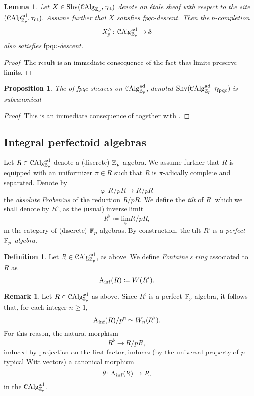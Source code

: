 \documentclass[10pt,a4paper]{amsart}
\numberwithin{equation}{subsection}
\newtheorem{lemma}[theorem]{Lemma}
\newtheorem{proposition}[theorem]{Proposition}
\theoremstyle{definition}
\newtheorem{remark}[theorem]{Remark}
\newtheorem{definition}[theorem]{Definition}
\def\lim{\mathrm{lim}}
\begin{document}
\begin{lemma}
    Let $X \in \mathrm{Shv}(\mathcal{C}\mathrm{Alg}_{\mathbb Z_p}, \tau_{\text{\'et}})$ denote an \'etale sheaf with respect to the site $(\mathcal C \mathrm{Alg}^{\mathrm{ad}}_{\mathbb Z_p}, \tau_{\text{\'et}})$. Assume further that $X$ satisfies \emph{fpqc}-descent. Then the $p$-completion
        \[
                X^\wedge_p \colon \mathcal C \mathrm{Alg}^{\mathrm{ad}}_{\mathbb Z_p} \to \mathcal S  
        \]
    also satisfies $\mathrm{fpqc}$-descent.
\end{lemma}

\begin{proof}
    The result is an immediate consequence of the fact that limits preserve limits. 
\end{proof}

\begin{proposition}
    The \infcat of fpqc-sheaves on $\mathcal C \mathrm{Alg}^{\mathrm{ad}}_{\mathbb Z_p}$, denoted $\mathrm{Shv}(\mathcal C \mathrm{Alg}^{\mathrm{ad}}_{\mathbb Z_p}, \tau_{\mathrm{fpqc}})$ is subcanonical.
\end{proposition}

\begin{proof}
    This is an immediate consequence of \cite[Theorem 5.15]{Lurie_Spectral_Schemes} together with \cite[Proposition 8.1.2.1]{lurie2016spectral}.
\end{proof}
\subsection{Integral perfectoid algebras}

Let $R \in \mathcal C \mathrm{Alg}^{\mathrm{ad}}_{\mathbb Z_p}$ denote a (discrete) $\mathbb Z_p$-algebra. We assume further that $R$ is equipped with an uniformizer $\pi \in R$ such that $R$ is
$\pi$-adically complete and separated. Denote by
    \[
        \varphi \colon R/ pR \to R/p  R
    \]
the \emph{absolute Frobenius} of the reduction $R/pR$. We define the \emph{tilt} of $R$, which we shall denote by $R^\flat$, as the (usual) inverse limit
    \[
        R^\flat \coloneqq \underset{\varphi }{\lim} R/ pR, 
    \]
in the category of (discrete) $\mathbb F_p$-algebras. By construction, the tilt $R^\flat$ is a \emph{perfect $\mathbb F_p$-algebra.}

\begin{definition}
    Let $R \in \mathcal C \mathrm{Alg}^{\mathrm{ad}}_{\mathbb Z_p}$, as above. We define \emph{Fontaine's ring} associated to $R$ as
        \[
                \mathrm{A}_{\mathrm{inf}}(R) \coloneqq W(R^\flat).
        \]
\end{definition}

\begin{remark}
    Let $R \in \mathcal C \mathrm{Alg}^{\mathrm{ad}}_{\mathbb Z_p}$ as above. Since $R^\flat$ is a perfect $\mathbb F_p$-algebra, it follows that, for each integer $n \geq 1$, 
        \[
            \mathrm{A}_{\mathrm{inf}}(R)/ p^n \simeq W_n(R^\flat).
        \]
    For this reason, the natural morphism
        \[
            R^\flat \to R/pR,  
        \]
    induced by projection on the first factor, induces (by the universal property of $p$-typical Witt vectors) a canonical morphism
        \[
                \theta \colon \mathrm{A}_{\mathrm{inf}}(R) \to R,
        \]  
    in the \infcat $\mathcal C \mathrm{Alg}^{\mathrm{ad}}_{\mathbb Z_p}$.
\end{remark}
\end{document}
